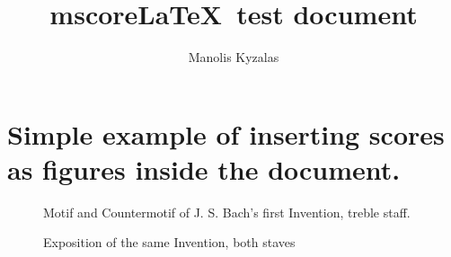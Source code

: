 \documentclass{article}
\title{mscore\LaTeX\ test document}
\author{Manolis Kyzalas}
\begin{document}
    \maketitle

    \listoffigures

    \section*{Simple example of inserting scores as figures inside the document.}

    \begin{figure}[h]
        \centering
        \caption{Motif and Countermotif of J. S. Bach's first Invention, treble staff.}
    \end{figure}

    \begin{figure}[h]
        \centering
        \caption{Exposition of the same Invention, both staves}
    \end{figure}
\end{document}
